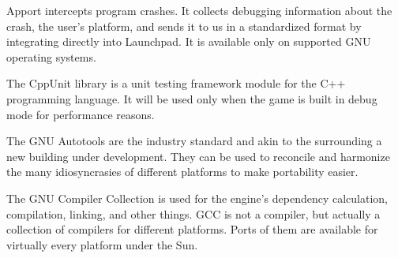 

\startitemize[4]

Apport intercepts program crashes. It collects debugging information about the crash, the user's platform, and sends it to us in a standardized format by integrating directly into Launchpad. It is available only on supported GNU operating systems.


The CppUnit library is a unit testing framework module for the C++ programming language. It will be used only when the game is built in debug mode for performance reasons.


The GNU Autotools are the industry standard and akin to the  surrounding a new building under development. They can be used to reconcile and harmonize the many idiosyncrasies of different platforms to make  portability easier.



The GNU Compiler Collection is used for the engine's dependency calculation, compilation, linking, and other things. GCC is not a compiler, but actually a collection of compilers for different platforms. Ports of them are available for virtually every platform under the Sun.



